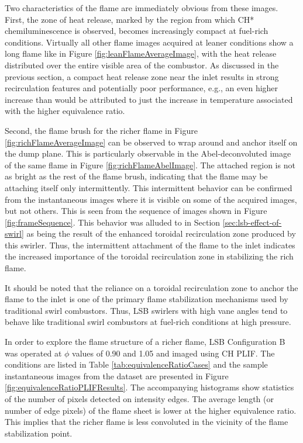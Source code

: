 


Two characteristics of the flame are immediately obvious from these images.
First, the zone of heat release, marked by the region from which CH* chemiluminescence is observed, becomes increasingly compact at fuel-rich conditions.
Virtually all other flame images acquired at leaner conditions show a long flame like in Figure \ref{fig:leanFlameAverageImage}, with the heat release distributed over the entire visible area of the combustor.
As discussed in the previous section, a compact heat release zone near the inlet results in strong recirculation features and potentially poor  performance, e.g., an even higher  increase than would be attributed to just the increase in temperature associated with the higher equivalence ratio.

Second, the flame brush for the richer flame in Figure \ref{fig:richFlameAverageImage} can be observed to wrap around and anchor itself on the dump plane.
This is particularly observable in the Abel-deconvoluted image of the same flame in Figure \ref{fig:richFlameAbelImage}.
The attached region is not as bright as the rest of the flame brush, indicating that the flame may be attaching itself only intermittently.
This intermittent behavior can be confirmed from the instantaneous images where it is visible on some of the acquired images, but not others.
This is seen from the sequence of images shown in Figure \ref{fig:frameSequence}.
This behavior was alluded to in Section \ref{sec:lsb-effect-of-swirl} as being the result of the enhanced toroidal recirculation zone produced by this swirler.
Thus, the intermittent attachment of the flame to the inlet indicates the increased importance of the toroidal recirculation zone in stabilizing the rich flame.



It should be noted that the reliance on a toroidal recirculation zone to anchor the flame to the inlet is one of the primary flame stabilization mechanisms used by traditional swirl combustors.
Thus, LSB swirlers with high vane angles tend to behave like traditional swirl combustors at fuel-rich conditions at high pressure.

In order to explore the flame structure of a richer flame, LSB Configuration B was operated at \(\phi\) values of 0.90 and 1.05 and imaged using CH PLIF.
The conditions are listed in Table \ref{tab:equivalenceRatioCases} and the sample instantaneous images from the dataset are presented in Figure \ref{fig:equivalenceRatioPLIFResults}.
The accompanying histograms show statistics of the number of pixels detected on intensity edges.
The average length (or number of edge pixels) of the flame sheet is lower at the higher equivalence ratio.
This implies that the richer flame is less convoluted in the vicinity of the flame stabilization point.

